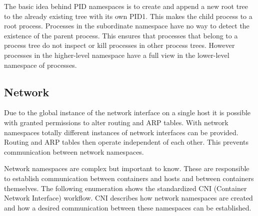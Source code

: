 The basic idea behind PID namespaces is to create and append a new root tree to the already existing tree with its own PID1. This makes the child process to a root process.
Processes in the subordinate namespace have no way to detect the existence of the parent process. This ensures that processes that belong to a process tree do not inspect or kill processes in other process trees. However processes in the higher-level namespace have a full view in the lower-level namespace of processes.

\subsection{Network}
\label{sec:intro:containerization:linux_namespaces:network_namespaces}
Due to the global instance of the network interface on a single host it is possible with granted permissions to alter routing and ARP tables. With network namespaces totally different instances of network interfaces can be provided. Routing and ARP tables then operate independent of each other. This prevents communication between network namespaces.
 
Network namespaces are complex but important to know. These are responsible to establish communication between containers and hosts and between containers themselves. 
The following enumeration shows the standardized CNI (Container Network Interface) workflow. CNI describes how network namespaces are created and how a desired communication between these namespaces can be established.

